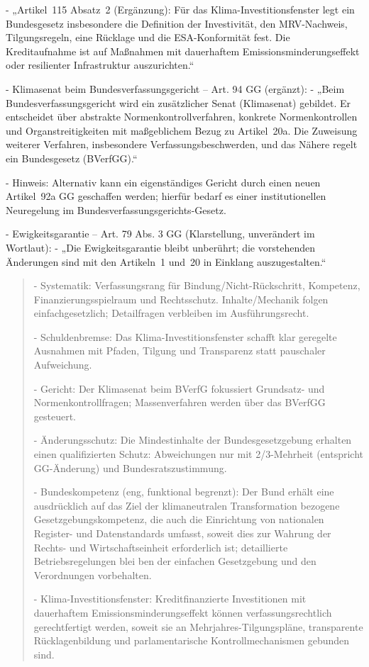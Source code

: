 \documentclass[12pt,a4paper]{scrartcl}
\begin{document}
- „Artikel 115 Absatz 2 (Ergänzung): Für das Klima-Investitionsfenster legt ein Bundesgesetz insbesondere die Definition der Investivität, den MRV-Nachweis, Tilgungsregeln, eine Rücklage und die ESA-Konformität fest. Die Kreditaufnahme ist auf Maßnahmen mit dauerhaftem Emissionsminderungseffekt oder resilienter Infrastruktur auszurichten.“

- Klimasenat beim Bundesverfassungsgericht -- Art. 94 GG (ergänzt):
- „Beim Bundesverfassungsgericht wird ein zusätzlicher Senat (Klimasenat) gebildet. Er entscheidet über abstrakte Normenkontrollverfahren, konkrete Normenkontrollen und Organstreitigkeiten mit maßgeblichem Bezug zu Artikel 20a. Die Zuweisung weiterer Verfahren, insbesondere Verfassungsbeschwerden, und das Nähere regelt ein Bundesgesetz (BVerfGG).“

- Hinweis: Alternativ kann ein eigenständiges Gericht durch einen neuen Artikel 92a GG geschaffen werden; hierfür bedarf es einer institutionellen Neuregelung im Bundesverfassungsgerichts-Gesetz.

- Ewigkeitsgarantie -- Art. 79 Abs. 3 GG (Klarstellung, unverändert im Wortlaut):
- „Die Ewigkeitsgarantie bleibt unberührt; die vorstehenden Änderungen sind mit den Artikeln 1 und 20 in Einklang auszugestalten.“

{\footnotesize\begin{quote}
- Systematik: Verfassungsrang für Bindung/Nicht-Rückschritt, Kompetenz, Finanzierungsspielraum und Rechtsschutz. Inhalte/Mechanik folgen einfachgesetzlich; Detailfragen verbleiben im Ausführungsrecht.

- Schuldenbremse: Das Klima-Investitionsfenster schafft klar geregelte Ausnahmen mit Pfaden, Tilgung und Transparenz statt pauschaler Aufweichung.

- Gericht: Der Klimasenat beim BVerfG fokussiert Grundsatz- und Normenkontrollfragen; Massenverfahren werden über das BVerfGG gesteuert.

- Änderungsschutz: Die Mindestinhalte der Bundesgesetzgebung erhalten einen qualifizierten Schutz: Abweichungen nur mit 2/3-Mehrheit (entspricht GG-Änderung) und Bundesratszustimmung.

- Bundeskompetenz (eng, funktional begrenzt): Der Bund erhält eine ausdrücklich auf das Ziel der klimaneutralen Transformation bezogene Gesetzgebungskompetenz, die auch die Einrichtung von nationalen Register- und Datenstandards umfasst, soweit dies zur Wahrung der Rechts- und Wirtschaftseinheit erforderlich ist; detaillierte Betriebsregelungen blei ben der einfachen Gesetzgebung und den Verordnungen vorbehalten.

- Klima-Investitionsfenster: Kreditfinanzierte Investitionen mit dauerhaftem Emissionsminderungseffekt können verfassungsrechtlich gerechtfertigt werden, soweit sie an Mehrjahres-Tilgungspläne, transparente Rücklagenbildung und parlamentarische Kontrollmechanismen gebunden sind.
\end{quote}}
\end{document}
